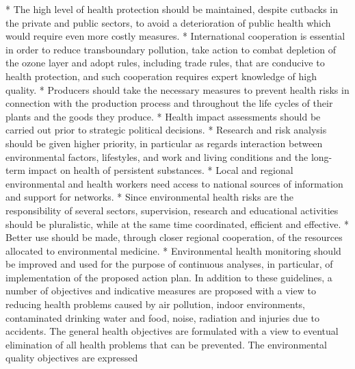 * The high level of health protection should be maintained, despite cutbacks in the private and public sectors, to avoid a deterioration of public health which would require even more costly measures.
* International cooperation is essential in order to reduce transboundary pollution, take action to combat depletion of the ozone layer and adopt rules, including trade rules, that are conducive to health protection, and such cooperation requires expert knowledge of high quality.
* Producers should take the necessary measures to prevent health risks in connection with the production process and throughout the life cycles of their plants and the goods they produce.
* Health impact assessments should be carried out prior to strategic political decisions.
* Research and risk analysis should be given higher priority, in particular as regards interaction between environmental factors, lifestyles, and work and living conditions and the long-term impact on health of persistent substances.
* Local and regional environmental and health workers need access to national sources of information and support for networks.
* Since environmental health risks are the responsibility of several sectors, supervision, research and educational activities should be pluralistic, while at the same time coordinated, efficient and effective.
* Better use should be made, through closer regional cooperation, of the resources allocated to environmental medicine.
* Environmental health monitoring should be improved and used for the purpose of continuous analyses, in particular, of implementation of the proposed action plan.
In addition to these guidelines, a number of objectives and indicative measures are proposed with a view to reducing health problems caused by air pollution, indoor environments, contaminated drinking water and food, noise, radiation and injuries due to accidents.
The general health objectives are formulated with a view to eventual elimination of all health problems that can be prevented. The environmental quality objectives are expressed

